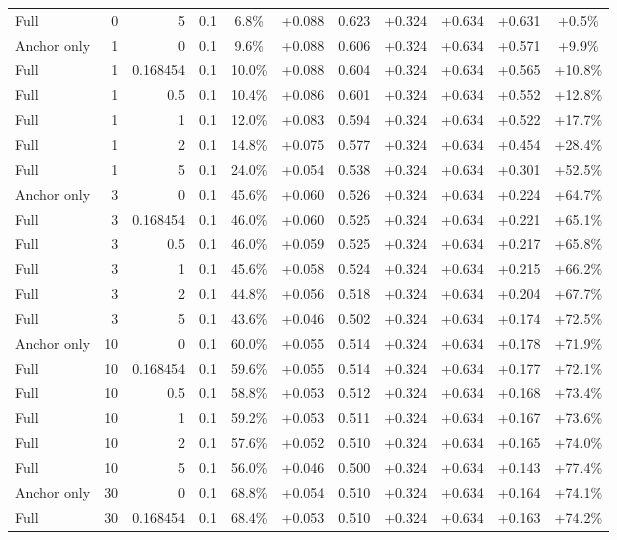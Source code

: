 \begin{table}[htbp]
\begin{tabular}{lrrrccccccc}
Full & 0 & 5 & 0.1 & 6.8\% & +0.088 & 0.623 & +0.324 & +0.634 & +0.631 & +0.5\% \\
Anchor only & 1 & 0 & 0.1 & 9.6\% & +0.088 & 0.606 & +0.324 & +0.634 & +0.571 & +9.9\% \\
Full & 1 & 0.168454 & 0.1 & 10.0\% & +0.088 & 0.604 & +0.324 & +0.634 & +0.565 & +10.8\% \\
Full & 1 & 0.5 & 0.1 & 10.4\% & +0.086 & 0.601 & +0.324 & +0.634 & +0.552 & +12.8\% \\
Full & 1 & 1 & 0.1 & 12.0\% & +0.083 & 0.594 & +0.324 & +0.634 & +0.522 & +17.7\% \\
Full & 1 & 2 & 0.1 & 14.8\% & +0.075 & 0.577 & +0.324 & +0.634 & +0.454 & +28.4\% \\
Full & 1 & 5 & 0.1 & 24.0\% & +0.054 & 0.538 & +0.324 & +0.634 & +0.301 & +52.5\% \\
Anchor only & 3 & 0 & 0.1 & 45.6\% & +0.060 & 0.526 & +0.324 & +0.634 & +0.224 & +64.7\% \\
Full & 3 & 0.168454 & 0.1 & 46.0\% & +0.060 & 0.525 & +0.324 & +0.634 & +0.221 & +65.1\% \\
Full & 3 & 0.5 & 0.1 & 46.0\% & +0.059 & 0.525 & +0.324 & +0.634 & +0.217 & +65.8\% \\
Full & 3 & 1 & 0.1 & 45.6\% & +0.058 & 0.524 & +0.324 & +0.634 & +0.215 & +66.2\% \\
Full & 3 & 2 & 0.1 & 44.8\% & +0.056 & 0.518 & +0.324 & +0.634 & +0.204 & +67.7\% \\
Full & 3 & 5 & 0.1 & 43.6\% & +0.046 & 0.502 & +0.324 & +0.634 & +0.174 & +72.5\% \\
Anchor only & 10 & 0 & 0.1 & 60.0\% & +0.055 & 0.514 & +0.324 & +0.634 & +0.178 & +71.9\% \\
Full & 10 & 0.168454 & 0.1 & 59.6\% & +0.055 & 0.514 & +0.324 & +0.634 & +0.177 & +72.1\% \\
Full & 10 & 0.5 & 0.1 & 58.8\% & +0.053 & 0.512 & +0.324 & +0.634 & +0.168 & +73.4\% \\
Full & 10 & 1 & 0.1 & 59.2\% & +0.053 & 0.511 & +0.324 & +0.634 & +0.167 & +73.6\% \\
Full & 10 & 2 & 0.1 & 57.6\% & +0.052 & 0.510 & +0.324 & +0.634 & +0.165 & +74.0\% \\
Full & 10 & 5 & 0.1 & 56.0\% & +0.046 & 0.500 & +0.324 & +0.634 & +0.143 & +77.4\% \\
Anchor only & 30 & 0 & 0.1 & 68.8\% & +0.054 & 0.510 & +0.324 & +0.634 & +0.164 & +74.1\% \\
Full & 30 & 0.168454 & 0.1 & 68.4\% & +0.053 & 0.510 & +0.324 & +0.634 & +0.163 & +74.2\% \\

\end{tabular}
\end{table}
